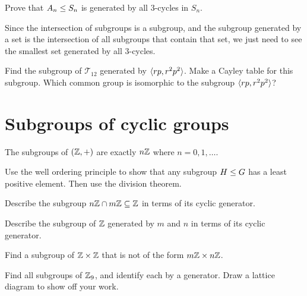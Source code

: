 \documentclass{ximera}
\begin{document}
\begin{exercise}
  Prove that $A_n\leq S_n$ is generated by all $3$-cycles in $S_n$.
  \begin{hint}
    Since the intersection of subgroups is a subgroup, and the
    subgroup generated by a set is the intersection of all subgroups
    that contain that set, we just need to see the smallest set
    generated by all $3$-cycles.
  \end{hint}
\end{exercise}

\begin{exercise}
  Find the subgroup of $\mathcal{T}_{12}$ generated by $\langle rp,
  r^2p^2\rangle$. Make a Cayley table for this subgroup. Which common
  group is isomorphic to the subgroup $\langle rp, r^2p^2\rangle$?
\end{exercise}





\section{Subgroups of cyclic groups}

\begin{theorem}
  The subgroups of $(\mathbb Z,+)$ are exactly $n\mathbb Z$ where $n = 0,1,\dots$.
  \begin{sketch}
    Use the well ordering principle to show that any subgroup $H\leq
    G$ has a least positive element. Then use the division theorem.
  \end{sketch}
\end{theorem}

\begin{exercise}
  Describe the subgroup $n\mathbb Z\cap m\mathbb Z \subseteq \mathbb Z$ in terms of its
  cyclic generator.
\end{exercise}


\begin{exercise}
  Describe the subgroup of $\mathbb Z$ generated by $m$ and $n$ in terms of
  its cyclic generator.
\end{exercise}

\begin{exercise}
  Find a subgroup of $\mathbb Z\times\mathbb Z$ that is not of the form $m\mathbb Z \times
  n\mathbb Z$.
\end{exercise}


\begin{exercise}
  Find all subgroups of $\mathbb Z_9$, and identify each by a generator. Draw
  a lattice diagram to show off your work.
\end{exercise}
\end{document}
